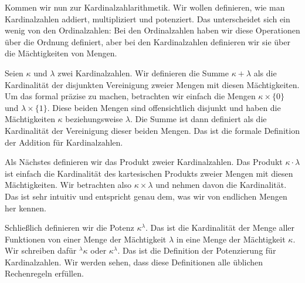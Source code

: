 \begin{spoken-clean}[01:07:21 - 01:09:45]
Kommen wir nun zur Kardinalzahlarithmetik. Wir wollen definieren, wie man Kardinalzahlen addiert, multipliziert und potenziert. Das unterscheidet sich ein wenig von den Ordinalzahlen: Bei den Ordinalzahlen haben wir diese Operationen über die Ordnung definiert, aber bei den Kardinalzahlen definieren wir sie über die Mächtigkeiten von Mengen.
\end{spoken-clean}

\begin{spoken-clean}[01:09:45 - 01:12:09]
Seien $\kappa$ und $\lambda$ zwei Kardinalzahlen. Wir definieren die Summe $\kappa + \lambda$ als die Kardinalität der disjunkten Vereinigung zweier Mengen mit diesen Mächtigkeiten. Um das formal präzise zu machen, betrachten wir einfach die Mengen $\kappa \times \{0\}$ und $\lambda \times \{1\}$. Diese beiden Mengen sind offensichtlich disjunkt und haben die Mächtigkeiten $\kappa$ beziehungsweise $\lambda$. Die Summe ist dann definiert als die Kardinalität der Vereinigung dieser beiden Mengen. Das ist die formale Definition der Addition für Kardinalzahlen.
\end{spoken-clean}

\begin{math-stroke}
\end{math-stroke}

\begin{spoken-clean}[01:12:09 - 01:14:20]
Als Nächstes definieren wir das Produkt zweier Kardinalzahlen. Das Produkt $\kappa \cdot \lambda$ ist einfach die Kardinalität des kartesischen Produkts zweier Mengen mit diesen Mächtigkeiten. Wir betrachten also $\kappa \times \lambda$ und nehmen davon die Kardinalität. Das ist sehr intuitiv und entspricht genau dem, was wir von endlichen Mengen her kennen.
\end{spoken-clean}

\begin{spoken-clean}[01:14:20 - 01:16:39]
Schließlich definieren wir die Potenz $\kappa^\lambda$. Das ist die Kardinalität der Menge aller Funktionen von einer Menge der Mächtigkeit $\lambda$ in eine Menge der Mächtigkeit $\kappa$. Wir schreiben dafür ${}^\lambda \kappa$ oder $\kappa^\lambda$. Das ist die Definition der Potenzierung für Kardinalzahlen. Wir werden sehen, dass diese Definitionen alle üblichen Rechenregeln erfüllen.
\end{spoken-clean}

